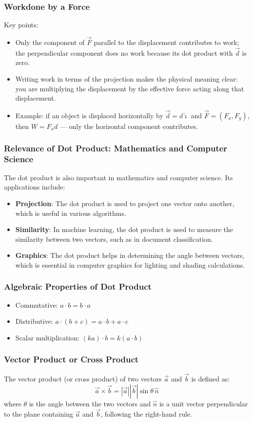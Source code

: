 \begin{frame} 
    \frametitle{Workdone by a Force}
Key points:
\begin{itemize}
    \item Only the component of \(\vec{F}\) parallel to the displacement contributes to work; the perpendicular component does no work because its dot product with \(\vec{d}\) is zero.
    \item Writing work in terms of the projection makes the physical meaning clear: you are multiplying the displacement by the effective force acting along that displacement.
    \item Example: if an object is displaced horizontally by \(\vec{d}=d\hat{\imath}\) and \(\vec{F}=(F_x,F_y)\), then \(W=F_x d\) — only the horizontal component contributes.
\end{itemize}
\end{frame}
\begin{frame}
\frametitle{Relevance of Dot Product: Mathematics and Computer Science}
The dot product is also important in mathematics and computer science. Its applications include:
\begin{itemize}
    \item \textbf{Projection}: The dot product is used to project one vector onto another, which is useful in various algorithms.
    \item \textbf{Similarity}: In machine learning, the dot product is used to measure the similarity between two vectors, such as in document classification.
    \item \textbf{Graphics}: The dot product helps in determining the angle between vectors, which is essential in computer graphics for lighting and shading calculations.
\end{itemize}
\end{frame}
\begin{frame}
    \frametitle{Algebraic Properties of Dot Product}
    \begin{itemize}
        \item Commutative: \(a \cdot b = b \cdot a\)
        \item Distributive: \(a \cdot (b + c) = a \cdot b + a \cdot c\)
        \item Scalar multiplication: \((k a) \cdot b = k (a \cdot b)\)
    \end{itemize}
\end{frame}

\begin{frame}
    \frametitle{Vector Product or Cross Product}
    The vector product (or cross product) of two vectors \(\vec{a}\) and \(\vec{b}\) is defined as:
    \[
    \vec{a} \times \vec{b} = |\vec{a}| |\vec{b}| \sin \theta \, \hat{n}
    \]
    where \(\theta\) is the angle between the two vectors and \(\hat{n}\) is a unit vector perpendicular to the plane containing \(\vec{a}\) and \(\vec{b}\), following the right-hand rule.
\end{frame}

